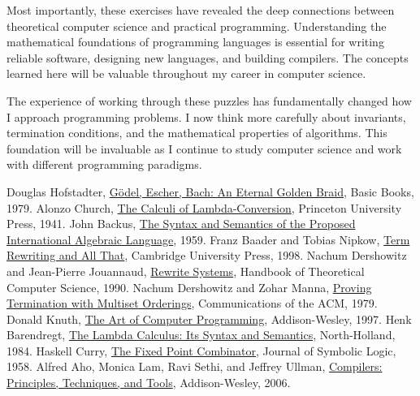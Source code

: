 \documentclass{article}
\theoremstyle{plain}
\theoremstyle{definition}
\theoremstyle{remark}
\begin{document}
Most importantly, these exercises have revealed the deep connections between theoretical computer science and practical programming. Understanding the mathematical foundations of programming languages is essential for writing reliable software, designing new languages, and building compilers. The concepts learned here will be valuable throughout my career in computer science.

The experience of working through these puzzles has fundamentally changed how I approach programming problems. I now think more carefully about invariants, termination conditions, and the mathematical properties of algorithms. This foundation will be invaluable as I continue to study computer science and work with different programming paradigms.

\begin{thebibliography}{99}
 Douglas Hofstadter, \href{https://en.wikipedia.org/wiki/G%C3%B6del,_Escher,_Bach}{Gödel, Escher, Bach: An Eternal Golden Braid}, Basic Books, 1979.
 Alonzo Church, \href{https://en.wikipedia.org/wiki/Lambda_calculus}{The Calculi of Lambda-Conversion}, Princeton University Press, 1941.
 John Backus, \href{https://en.wikipedia.org/wiki/Backus%E2%80%93Naur_form}{The Syntax and Semantics of the Proposed International Algebraic Language}, 1959.
 Franz Baader and Tobias Nipkow, \href{https://en.wikipedia.org/wiki/Abstract_rewriting_system}{Term Rewriting and All That}, Cambridge University Press, 1998.
 Nachum Dershowitz and Jean-Pierre Jouannaud, \href{https://en.wikipedia.org/wiki/Term_rewriting}{Rewrite Systems}, Handbook of Theoretical Computer Science, 1990.
 Nachum Dershowitz and Zohar Manna, \href{https://en.wikipedia.org/wiki/Termination_analysis}{Proving Termination with Multiset Orderings}, Communications of the ACM, 1979.
 Donald Knuth, \href{https://en.wikipedia.org/wiki/Euclidean_algorithm}{The Art of Computer Programming}, Addison-Wesley, 1997.
 Henk Barendregt, \href{https://en.wikipedia.org/wiki/Lambda_calculus}{The Lambda Calculus: Its Syntax and Semantics}, North-Holland, 1984.
 Haskell Curry, \href{https://en.wikipedia.org/wiki/Fixed-point_combinator}{The Fixed Point Combinator}, Journal of Symbolic Logic, 1958.
 Alfred Aho, Monica Lam, Ravi Sethi, and Jeffrey Ullman, \href{https://en.wikipedia.org/wiki/Compiler}{Compilers: Principles, Techniques, and Tools}, Addison-Wesley, 2006.
\end{thebibliography}
\end{document}
